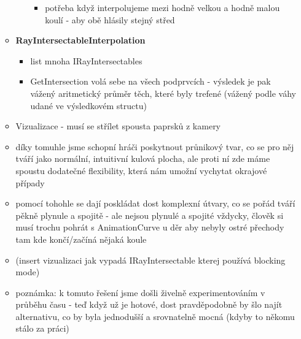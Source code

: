 \begin{itemize}
\begin{itemize}
\begin{itemize}
\begin{itemize}
                        \item potřeba když interpolujeme mezi hodně velkou a hodně malou koulí - aby obě hlásily stejný střed
                    \end{itemize}
                \end{itemize}
            \item \textbf{RayIntersectableInterpolation}
                \begin{itemize}
                    \item list mnoha IRayIntersectables
                    \item GetIntersection volá sebe na všech podprvcích - výsledek je pak vážený aritmetický průměr těch, které byly trefené (vážený podle váhy udané ve výsledkovém structu)
                \end{itemize}
            \item Vizualizace - musí se střílet spousta paprsků z kamery 
            \item díky tomuhle jsme schopní hráči poskytnout průnikový tvar, co se pro něj tváří jako normální, intuitivní kulová plocha, ale proti ní zde máme spoustu dodatečné flexibility, která nám umožní vychytat okrajové případy
            \item pomocí tohohle se dají poskládat dost komplexní útvary, co se pořád tváří pěkně plynule a spojitě - ale nejsou plynulé a spojité vždycky, člověk si musí trochu pohrát s AnimationCurve u děr aby nebyly ostré přechody tam kde končí/začíná nějaká koule
            \item (insert vizualizaci jak vypadá IRayIntersectable kterej používá blocking mode)
            \item poznámka: k tomuto řešení jsme došli živelně experimentováním v průběhu času - teď když už je hotové, dost pravděpodobně by šlo najít alternativu, co by byla jednodušší a srovnatelně mocná (kdyby to někomu stálo za práci)
        \end{itemize}
\end{itemize}

